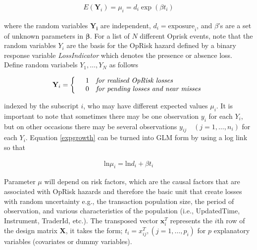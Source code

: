 \documentclass{DissertateUSU}
\begin{document}
\singlespacing

\begin{eqnarray}\label{expgrowth}
E(\mathbf{Y}_i) = \mu_i = d_i\exp{(\beta t_i)} 
\end{eqnarray} \doublespacing

where the random variables \(\mathbf{Y_i}\) are independent,
\(d_i = \mbox{exposure}_i\), and \(\beta\)'s are a set of unknown
parameters in \(\mathbf{\beta}\). For a list of \(N\) different Oprisk
events, note that the random variables \(Y_i\) are the basis for the
OpRisk hazard defined by a binary response variable \emph{LossIndicator}
which denotes the presence or absence loss. Define random variabels
\(Y_1,\ldots,Y_N\) as follows

\begin{definition}\label{DefLosInd}
\singlespacing
\begin{equation}\label{LossIndicator}
\mathbf {Y}_i =\left\{\begin{array}{rcl}
                 & 1 & \mbox{\it{for realised OpRisk losses}}  \\
                 & 0 & \mbox{\it{for pending losses and near misses}} 
                      \end{array}\right.
\end{equation}
\doublespacing
\end{definition}

indexed by the subscript \(i\), who may have different expected values
\(\mu_i\). It is important to note that sometimes there may be one
observation \(y_i\) for each \(Y_i\), but on other occasions there may
be several observations \(y_{ij}\quad(j=1,\ldots,n_i)\) for each
\(Y_i\). Equation \ref{expgrowth} can be turned into GLM form by using a
log link so that

\singlespacing

\begin{eqnarray}\label{linearcombination}
\mbox{ln}\mu_i = \mbox{ln}d_i + \beta t_i
\end{eqnarray} \doublespacing

Parameter \(\mu\) will depend on risk factors, which are the causal
factors that are associated with OpRisk hazards and therefore the basic
unit that create losses with random uncertainty e.g., the transaction
population size, the period of observation, and various characteristics
of the population (i.e., UpdatedTime, Instrument, TraderId, etc.). The
transposed vector \(\mathbf{x}_i^T\) represents the \(i\)th row of the
design matrix \(\mathbf{X}\), it takes the form;
\(t_i = x_{ij}^T, (j=1,\ldots,p_i)\) for \(p\) explanatory variables
(covariates or dummy variables).\medskip
\end{document}
